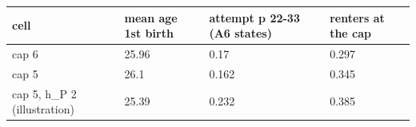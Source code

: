 \begingroup\small
\setlength{\tabcolsep}{3pt}
\renewcommand{\arraystretch}{1.04}
\begin{tabularx}{\linewidth}{XXXX}
\toprule
cell & mean age 1st birth & attempt p 22-33 (A6 states) & renters at the cap \\
\midrule
cap 6 & 25.96 & 0.17 & 0.297 \\
cap 5 & 26.1 & 0.162 & 0.345 \\
cap 5, h\_P 2 (illustration) & 25.39 & 0.232 & 0.385 \\
\bottomrule
\end{tabularx}
\endgroup
